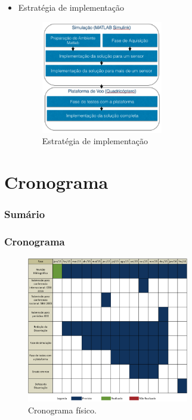 \documentclass{beamer}
\begin{document}
\begin{frame}[allowframebreaks]
\begin{itemize}
\begin{itemize}
		\end{itemize}
	
	\framebreak	
		
		\item Estratégia de implementação
		
		\begin{figure}[h]
			\centering
			\includegraphics[keepaspectratio = true,
			width=0.5\textwidth]{img/fluxo.png}
			\caption{Estratégia de implementação}
			\label{fig:Fluxo}
		\end{figure}
			
	\end{itemize}	 
	
\end{frame}


\section{Cronograma}

\begin{frame}
	\frametitle{Sumário}
	\tableofcontents[currentsection]
\end{frame}

\begin{frame}
	
	\frametitle{Cronograma}
	
	\begin{figure}[h]
		\centering
		\includegraphics[keepaspectratio = true,
		width=0.63\textwidth]{img/cronograma.png}
		\caption{Cronograma físico.}
		\label{fig:cronograma}
	\end{figure}
	
\end{frame}	
\end{document}
